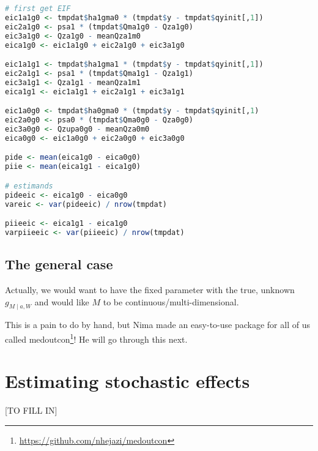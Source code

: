 \documentclass[
  12pt,
]{book}
\renewcommand{\href}[2]{#2\footnote{\url{#1}}}
\theoremstyle{definition}
\theoremstyle{definition}
\theoremstyle{definition}
\newcommand{\1}{\mathbbm{1}}
\begin{document}
\begin{lstlisting}[language=R]
# first get EIF
eic1a1g0 <- tmpdat$ha1gma0 * (tmpdat$y - tmpdat$qyinit[,1])
eic2a1g0 <- psa1 * (tmpdat$Qma1g0 - Qza1g0)
eic3a1g0 <- Qza1g0 - meanQza1m0
eica1g0 <- eic1a1g0 + eic2a1g0 + eic3a1g0

eic1a1g1 <- tmpdat$ha1gma1 * (tmpdat$y - tmpdat$qyinit[,1])
eic2a1g1 <- psa1 * (tmpdat$Qma1g1 - Qza1g1)
eic3a1g1 <- Qza1g1 - meanQza1m1
eica1g1 <- eic1a1g1 + eic2a1g1 + eic3a1g1

eic1a0g0 <- tmpdat$ha0gma0 * (tmpdat$y - tmpdat$qyinit[,1)
eic2a0g0 <- psa0 * (tmpdat$Qma0g0 - Qza0g0)
eic3a0g0 <- Qzupa0g0 - meanQza0m0
eica0g0 <- eic1a0g0 + eic2a0g0 + eic3a0g0

pide <- mean(eica1g0 - eica0g0)
piie <- mean(eica1g1 - eica1g0)

# estimands
pideeic <- eica1g0 - eica0g0
vareic <- var(pideeic) / nrow(tmpdat)

piieeic <- eica1g1 - eica1g0
varpiieeic <- var(piieeic) / nrow(tmpdat)
\end{lstlisting}

\hypertarget{the-general-case}{%
\section{The general case}\label{the-general-case}}

Actually, we would want to have the fixed parameter with the true, unknown
\(g_{M \mid a, W}\) and would like \(M\) to be continuous/multi-dimensional.

This is a pain to do by hand, but Nima made an easy-to-use package for all of us
called \href{https://github.com/nhejazi/medoutcon}{medoutcon}! He will go through
this next.

\hypertarget{estimating-stochastic-effects}{%
\chapter{Estimating stochastic effects}\label{estimating-stochastic-effects}}

{[}TO FILL IN{]}

  

\backmatter
\printindex
\end{document}
